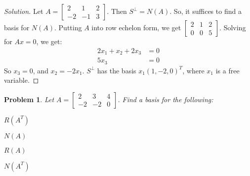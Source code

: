 \documentclass{article}
\theoremstyle{mystyle}
\newtheorem{problem}{Problem}[section]
\begin{document}
\begin{proof}[Solution]
Let $A = \begin{bmatrix} 2 & 1 & 2 \\ -2 & -1 & 3\end{bmatrix}$. Then $S^{\perp} = N(A)$. So, it suffices to find a basis for $N(A)$. Putting $A$ into row echelon form, we get $\begin{bmatrix} 2 & 1 & 2 \\ 0 & 0 & 5 \end{bmatrix}$. Solving for $Ax = 0$, we get:
\begin{align*}
     2x_1 + x_2 + 2x_3 &= 0\\ 
     5x_3 &= 0    
\end{align*}
So $x_3 = 0$, and $x_2 = - 2x_1$. $S^{\perp}$ has the basis $x_1(1,-2,0)^T$, where $x_1$ is a free variable.
\end{proof}
\begin{problem}
Let $A = \begin{bmatrix} 2 & 3 & 4 \\ -2 & -2 & 0 \end{bmatrix}$. Find a basis for the following:
\begin{enumerate}
\begin{multicols}{4}
    \item $R(A^T)$
    \item $N(A)$
    \item $R(A)$
    \item $N(A^T)$
\end{multicols}
\end{enumerate}
\end{problem}
\end{document}
